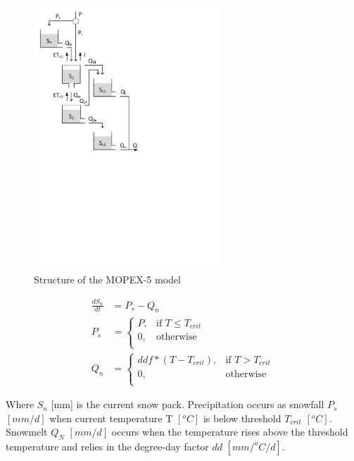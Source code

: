 { 																	%
\begin{figure}
\includegraphics[trim=1cm 13cm 7cm 1cm,width=7cm,keepaspectratio]{./files/35_schematic.pdf}
\caption{Structure of the MOPEX-5 model} \label{fig:35_schematic}
\end{figure}

\begin{align}
	\frac{dS_n}{dt} &= P_s-Q_{n} \\
	P_s &= \begin{cases}
		P, &\text{if } T \leq T_{crit} \\
		0, & \text{otherwise} \\
	\end{cases} \\
	Q_n &=\begin{cases}
		ddf*(T-T_{crit}), &\text{if } T > T_{crit} \\
		0, & \text{otherwise} \\
	\end{cases}
\end{align}

Where $S_n$ [mm] is the current snow pack. Precipitation occurs as snowfall $P_s$ $[mm/d]$ when current temperature T $[^oC]$ is below threshold $T_{crit}$ $[^oC]$. Snowmelt $Q_N$ $[mm/d]$ occurs when the temperature rises above the threshold temperature and relies in the degree-day factor $dd$ $[mm/^oC/d]$.

} %
\vspace{5cm}

